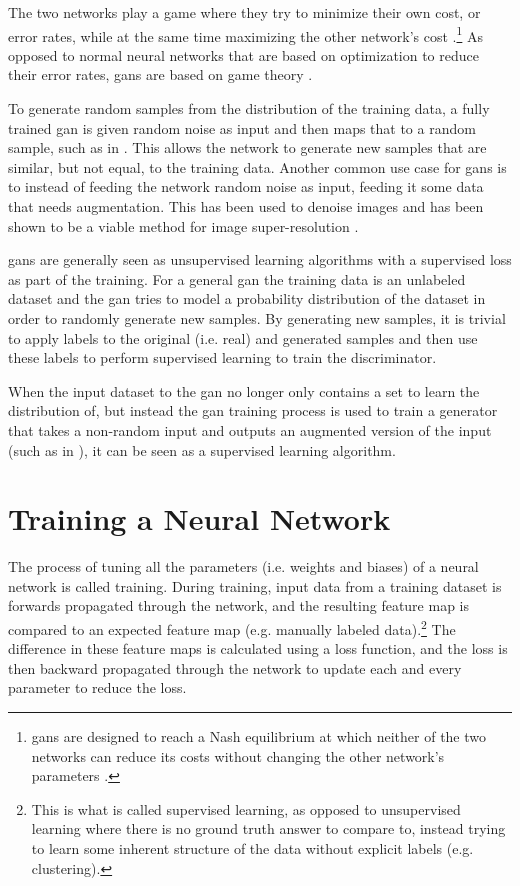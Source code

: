 The two networks play a game where they try to minimize their own cost, or error rates, while at the same time maximizing the other network's cost \cite{goodfellow2020gan}.\footnote{\gls{gan}s are designed to reach a Nash equilibrium at which neither of the two networks can reduce its costs without changing the other network's parameters \cite{liu2020tomogan}.} As opposed to normal neural networks that are based on optimization to reduce their error rates, \gls{gan}s are based on game theory \cite{goodfellow2020gan}. 

To generate random samples from the distribution of the training data, a fully trained \gls{gan} is given random noise as input and then maps that to a random sample, such as in \cite{zhangsagan}. This allows the network to generate new samples that are similar, but not equal, to the training data. Another common use case for \gls{gan}s is to instead of feeding the network random noise as input, feeding it some data that needs augmentation. This has been used to denoise images and has been shown to be a viable method for image super-resolution \cite{8710893,Ledig_2017_CVPR}. 

\glspl{gan} are generally seen as unsupervised learning algorithms with a supervised loss as part of the training. For a general \gls{gan} the training data is an unlabeled dataset and the \gls{gan} tries to model a probability distribution of the dataset in order to randomly generate new samples. By generating new samples, it is trivial to apply labels to the original (i.e. real) and generated samples and then use these labels to perform supervised learning to train the discriminator. 

When the input dataset to the \gls{gan} no longer only contains a set to learn the distribution of, but instead the \gls{gan} training process is used to train a generator that takes a non-random input and outputs an augmented version of the input (such as in \cite{liu2020tomogan}), it can be seen as a supervised learning algorithm.

\section{Training a Neural Network}
The process of tuning all the parameters (i.e. weights and biases) of a neural network is called training. During training, input data from a training dataset is forwards propagated through the network, and the resulting feature map is compared to an expected feature map (e.g. manually labeled data).\footnote{This is what is called supervised learning, as opposed to unsupervised learning where there is no ground truth answer to compare to, instead trying to learn some inherent structure of the data without explicit labels (e.g. clustering). } The difference in these feature maps is calculated using a loss function, and the loss is then backward propagated through the network to update each and every parameter to reduce the loss. 

